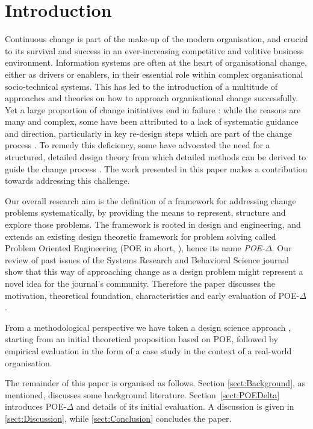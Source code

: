 \documentclass[runningheads,a4paper]{llncs}
\begin{document}
\section{Introduction}
Continuous change is part of the make-up of the  modern organisation, and crucial to its survival and success in an ever-increasing competitive and volitive business environment. Information systems are often at the heart of organisational change, either as drivers or enablers, in their essential role within complex organisational socio-technical systems. This has led to the introduction of a multitude of approaches and theories on how to approach organisational change successfully. Yet a large proportion of change initiatives end in failure \cite{burnes2011success}: while the reasons are many and complex, some have been attributed to a lack of systematic guidance and direction, particularly in key re-design steps which are part of the change process \cite{doi:10.1108/14637159910249117,Reijers2005283,Gerrits:1994:BMB:646303.686971}. To remedy this deficiency, some have advocated the need for a structured, detailed design theory from which detailed methods can be derived to guide the change process \cite{verkerk2004trust,Kleiner:2000vm,By:2005fm}. The work presented in this paper makes a contribution towards addressing this challenge.

Our overall research aim is the definition of a framework for addressing change problems systematically, by providing the means to represent, structure and  explore those problems. The framework is rooted in design and engineering, and extends an existing design theoretic framework for problem solving called Problem Oriented Engineering (POE in short, \cite{Hall2012ISSE}), hence its name {\it POE-$\Delta$}. Our review of past issues of the Systems Research and Behavioral Science journal show that this way of approaching change as a design problem might represent a novel idea for the journal's community. Therefore the paper discusses the motivation, theoretical foundation, characteristics and early evaluation of POE-$\Delta$.

From a methodological perspective we have taken a design science approach \cite{Hevner:2010ua}, starting from an initial theoretical proposition based on POE, followed by empirical evaluation in the form of a case study in the context of a real-world organisation. 

The remainder of this paper is organised as follows. Section \ref{sect:Background}, as mentioned, discusses some background literature. Section~\ref{sect:POEDelta} introduces POE-$\Delta$ and details of its initial evaluation. A discussion is given in  \ref{sect:Discussion}, while \ref{sect:Conclusion} concludes the paper. 
\end{document}

